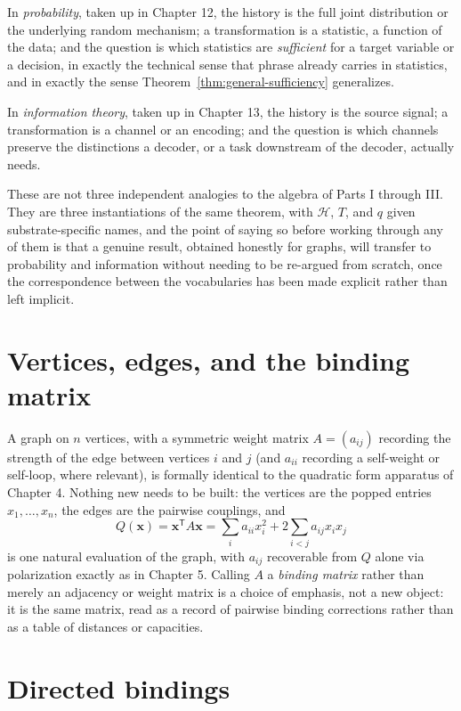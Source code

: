 \documentclass[11pt]{book}
\begin{document}
In \emph{probability}, taken up in Chapter 12, the history is the full joint distribution or the underlying random mechanism; a transformation is a statistic, a function of the data; and the question is which statistics are \emph{sufficient} for a target variable or a decision, in exactly the technical sense that phrase already carries in statistics, and in exactly the sense Theorem~\ref{thm:general-sufficiency} generalizes.

In \emph{information theory}, taken up in Chapter 13, the history is the source signal; a transformation is a channel or an encoding; and the question is which channels preserve the distinctions a decoder, or a task downstream of the decoder, actually needs.

These are not three independent analogies to the algebra of Parts I through III. They are three instantiations of the same theorem, with $\mathcal H$, $T$, and $q$ given substrate-specific names, and the point of saying so before working through any of them is that a genuine result, obtained honestly for graphs, will transfer to probability and information without needing to be re-argued from scratch, once the correspondence between the vocabularies has been made explicit rather than left implicit.

\section{Vertices, edges, and the binding matrix}

A graph on $n$ vertices, with a symmetric weight matrix $A=(a_{ij})$ recording the strength of the edge between vertices $i$ and $j$ (and $a_{ii}$ recording a self-weight or self-loop, where relevant), is formally identical to the quadratic form apparatus of Chapter 4. Nothing new needs to be built: the vertices are the popped entries $x_1,\ldots,x_n$, the edges are the pairwise couplings, and
\[
Q(\mathbf{x}) = \mathbf{x}^{\mathsf T}A\mathbf{x} = \sum_i a_{ii}x_i^2 + 2\sum_{i<j}a_{ij}x_ix_j
\]
is one natural evaluation of the graph, with $a_{ij}$ recoverable from $Q$ alone via polarization exactly as in Chapter 5. Calling $A$ a \emph{binding matrix} rather than merely an adjacency or weight matrix is a choice of emphasis, not a new object: it is the same matrix, read as a record of pairwise binding corrections rather than as a table of distances or capacities.

\section{Directed bindings}
\end{document}

